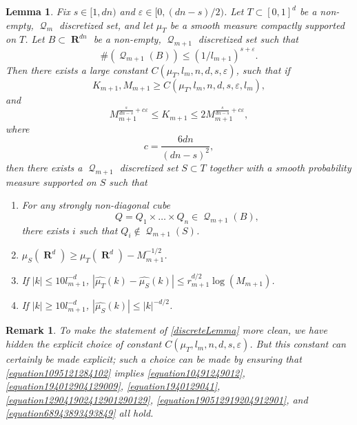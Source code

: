 \documentclass[12pt,reqno]{article}
\numberwithin{equation}{section}
\DeclareMathOperator{\RR}{\mathbf{R}}
\newtheorem{lemma}[theorem]{Lemma}
\newtheorem{remark}[theorem]{Remark}
\DeclareMathOperator{\DQ}{\mathcal{Q}}
\begin{document}
\begin{lemma} \label{discreteLemma}
    Fix $s \in [1,dn)$ and $\varepsilon \in [0,(dn-s)/2)$. Let $T \subset [0,1]^d$ be a non-empty, $\DQ_m$ discretized set, and let $\mu_T$ be a smooth measure compactly supported on $T$. Let $B \subset \RR^{dn}$ be a non-empty, $\DQ_{m+1}$ discretized set such that
    \begin{equation} \label{equation1290419204912090120912}
       \#(\DQ_{m+1}(B)) \leq (1/l_{m+1})^{s + \varepsilon}.
    \end{equation}
    Then there exists a large constant $C(\mu_T,l_m,n,d,s,\varepsilon)$, such that if
    \begin{equation} \label{equation1095121284102}
        K_{m+1}, M_{m+1} \geq C(\mu_T,l_m,n,d,s,\varepsilon,l_m),
    \end{equation}
    and
    \begin{equation} \label{equation5890129048128941891}
        M_{m+1}^{\frac{s}{dn-s} + c\varepsilon} \leq K_{m+1} \leq 2 M_{m+1}^{\frac{s}{dn-s} + c \varepsilon},
    \end{equation}
    where
    \[ c = \frac{6dn}{(dn - s)^2}, \]
    then there exists a $\DQ_{m+1}$ discretized set $S \subset T$ together with a smooth probability measure supported on $S$ such that
    \begin{enumerate}
        \item[(A)] For any strongly non-diagonal cube
        \[ Q = Q_1 \times \dots \times Q_n \in \DQ_{m+1}(B), \]
        there exists $i$ such that $Q_i \not \in \DQ_{m+1}(S)$.

        \item[(B)] $\mu_S(\RR^d) \geq \mu_T(\RR^d) - M_{m+1}^{-1/2}$.

        \item[(C)] If $|k| \leq 10 l_{m+1}^{-d}$, $|\widehat{\mu_T}(k) - \widehat{\mu_S}(k)| \leq r_{m+1}^{d/2} \log(M_{m+1})$.

        \item[(D)] If $|k| \geq 10 l_{m+1}^{-d}$, $|\widehat{\mu_S}(k)| \leq |k|^{-d/2}$.
    \end{enumerate}
\end{lemma}

\begin{remark}
    To make the statement of \eqref{discreteLemma} more clean, we have hidden the explicit choice of constant $C(\mu_T,l_m,n,d,s,\varepsilon)$. But this constant can certainly be made explicit; such a choice can be made by ensuring that \eqref{equation1095121284102} implies \eqref{equation10491249012}, \eqref{equation194012904129009}, \eqref{equation1940129041}, \eqref{equation129041902412901290129}, \eqref{equation190512919204912901}, and \eqref{equation68943893493849} all hold.%
\end{remark}
\end{document}
